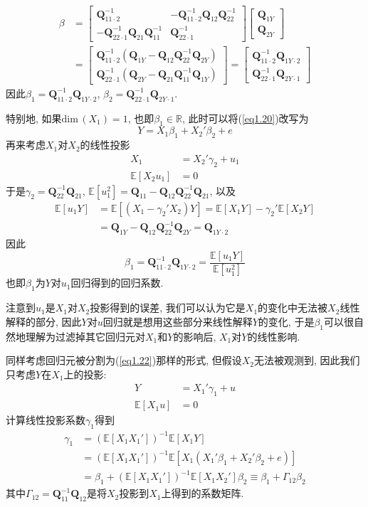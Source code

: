 \documentclass[cn, 12pt, math=mtpro2, bibstyle=apa, blue, twocol]{elegantbook}
\newcommand{\R}{\mathbb{R}}
\newcommand{\E}{\mathbb{E}}
\newcommand{\Q}{\mathbold{Q}}
\begin{document}
\begin{align}
\beta&=\begin{bmatrix}
\Q_{11\cdot 2}^{-1} & -\Q_{11\cdot2}^{-1}\Q_{12}\Q_{22}^{-1} \\
-\Q_{22\cdot1}^{-1}\Q_{21}\Q_{11}^{-1} & \Q_{22\cdot1}^{-1}
\end{bmatrix}\begin{bmatrix}
\Q_{1Y} \\
\Q_{2Y}
\end{bmatrix} \nonumber \\
&=\begin{bmatrix}
    \Q_{11\cdot2}^{-1}(\Q_{1Y}-\Q_{12}\Q_{22}^{-1}\Q_{2Y}) \\
    \Q_{22\cdot1}^{-1}(\Q_{2Y}-\Q_{21}\Q_{11}^{-1}\Q_{1Y})
  \end{bmatrix}=\begin{bmatrix}
                  \Q_{11\cdot2}^{-1}\Q_{1Y\cdot2} \\
                  \Q_{22\cdot1}^{-1}\Q_{2Y\cdot1}
                \end{bmatrix} \label{eq1.24}
\end{align}
因此$\beta_1=\Q_{11\cdot2}^{-1}\Q_{1Y\cdot2}$, $\beta_2=\Q_{22\cdot1}^{-1}\Q_{2Y\cdot1}$.

特别地, 如果$\text{dim}\,(X_1)=1$, 也即$\beta_1\in\R$, 此时可以将(\ref{eq1.20})改写为
\begin{equation}\label{eq1.21}
  Y=X_1\beta_1+X_2'\beta_2+e
\end{equation}
再来考虑$X_1$对$X_2$的线性投影
\begin{align*}
X_1&=X_2'\gamma_2+u_1 \\
\E[X_2u_1]&=0
\end{align*}
于是$\gamma_2=\Q_{22}^{-1}\Q_{21}$, $\E[u_1^2]=\Q_{11}-\Q_{12}\Q_{22}^{-1}\Q_{21}$, 以及
\begin{align*}
\E[u_1Y]&=\E[(X_1-\gamma_2'X_2)Y]=\E[X_1Y]-\gamma_2'\E[X_2Y] \\
&=\Q_{1Y}-\Q_{12}\Q_{22}^{-1}\Q_{2Y}=\Q_{1Y\cdot2}
\end{align*}
因此
$$\beta_1=\Q_{11\cdot2}^{-1}\Q_{1Y\cdot2}=\frac{\E[u_1Y]}{\E[u_1^2]}$$
也即$\beta_1$为$Y$对$u_1$回归得到的回归系数.

注意到$u_1$是$X_1$对$X_2$投影得到的误差, 我们可以认为它是$X_1$的变化中无法被$X_2$线性解释的部分, 因此$Y$对$u$回归就是想用这些部分来线性解释$Y$的变化, 于是$\beta_1$可以很自然地理解为过滤掉其它回归元对$X_1$和$Y$的影响后, $X_1$对$Y$的线性影响.

同样考虑回归元被分割为(\ref{eq1.22})那样的形式, 但假设$X_2$无法被观测到, 因此我们只考虑$Y$在$X_1$上的投影:
\begin{align}
Y&=X_1'\gamma_1+u \label{eq1.23} \\
\E[X_1u]&=0 \nonumber
\end{align}
计算线性投影系数$\gamma_1$得到
\begin{align*}
\gamma_1&=(\E[X_1X_1'])^{-1}\E[X_1Y] \\
&=(\E[X_1X_1'])^{-1}\E[X_1(X_1'\beta_1+X_2'\beta_2+e)] \\
&=\beta_1+(\E[X_1X_1'])^{-1}\E[X_1X_2']\beta_2\equiv \beta_1+\Gamma_{12}\beta_2
\end{align*}
其中$\Gamma_{12}=\Q_{11}^{-1}\Q_{12}$是将$X_2$投影到$X_1$上得到的系数矩阵.
\end{document}
